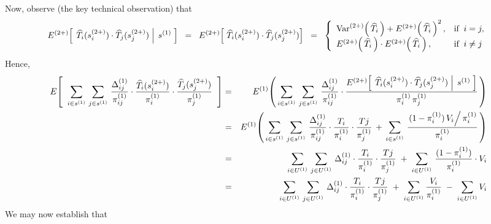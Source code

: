 Now, observe {\color{red}(the key technical observation)} that
\begin{equation*}
E^{(2+)}\!\left[\;\left.\widehat{T}_{i}(s^{(2+)}_{i})\cdot\widehat{T}_{j}(s^{(2+)}_{j})\;\right\vert\;s^{(1)}\;\right]
\;\;=\;\;
E^{(2+)}\!\left[\;\widehat{T}_{i}(s^{(2+)}_{i})\cdot\widehat{T}_{j}(s^{(2+)}_{j})\right]
\;\;=\;\;
\left\{
\begin{array}{ll}
\textnormal{Var}^{(2+)}\!\left(\,\widehat{T}_{i}\,\right) + E^{(2+)}\!\left(\,\widehat{T}_{i}\,\right)^{2}, & \textnormal{if}\;\; i = j, \\
E^{(2+)}\!\left(\,\widehat{T}_{i}\,\right)\cdot E^{(2+)}\!\left(\,\widehat{T}_{i}\,\right)      , & \textnormal{if}\;\; i \neq j
\end{array}
\right.
\end{equation*}
Hence,
\begin{eqnarray*}
E\!\left[\;\;
\sum_{i\in s^{(1)}}\,\sum_{j\in s^{(1)}}\,
\dfrac{\Delta^{(1)}_{ij}}{\pi^{(1)}_{ij}}
\cdot
\dfrac{\widehat{T}_{i}(s^{(2+)}_{i})}{\pi^{(1)}_{i}}
\cdot
\dfrac{\widehat{T}_{j}(s^{(2+)}_{j})}{\pi^{(1)}_{j}}
\;\;\right]
&=&
E^{(1)}\!\left(\,
\sum_{i\in s^{(1)}}\,\sum_{j\in s^{(1)}}\,
\dfrac{\Delta^{(1)}_{ij}}{\pi^{(1)}_{ij}}
\cdot
\dfrac{E^{(2+)}\!\left[\;\left.\widehat{T}_{i}(s^{(2+)}_{i})\cdot\widehat{T}_{j}(s^{(2+)}_{j})\;\right\vert\;s^{(1)}\;\right]}{\pi^{(1)}_{i}\,\pi^{(1)}_{j}}
\,\right)
\\
&=&
E^{(1)}\!\left(\,
\sum_{i\in s^{(1)}}\,\sum_{j\in s^{(1)}}\,
\dfrac{\Delta^{(1)}_{ij}}{\pi^{(1)}_{ij}}
\cdot
\dfrac{T_{i}}{\pi^{(1)}_{i}}\cdot\dfrac{T{j}}{\pi^{(1)}_{j}}
\,+\,
\sum_{i\in s^{(1)}}\,
\dfrac{\left.(1-\pi^{(1)}_{i})\,V_{i}\right/\pi^{(1)}_{i}}{\pi^{(1)}_{i}}
\,\right)
\\
&=&
\sum_{i \in U^{(1)}}\,\sum_{j \in U^{(1)}}\,
\Delta^{(1)}_{ij} \cdot \dfrac{T_{i}}{\pi^{(1)}_{i}} \cdot \dfrac{T{j}}{\pi^{(1)}_{j}}
\;+\;
\sum_{i \in U^{(1)}} \, \dfrac{(1-\pi^{(1)}_{i})}{\pi^{(1)}_{i}}\cdot V_{i}
\\
&=&
\sum_{i \in U^{(1)}}\,\sum_{j \in U^{(1)}}\,
\Delta^{(1)}_{ij} \cdot \dfrac{T_{i}}{\pi^{(1)}_{i}} \cdot \dfrac{T{j}}{\pi^{(1)}_{j}}
\;+\;
\sum_{i \in U^{(1)}} \dfrac{V_{i}}{\pi^{(1)}_{i}}
\;-\;
\sum_{i \in U^{(1)}} V_{i}
\end{eqnarray*}
We may now establish that
